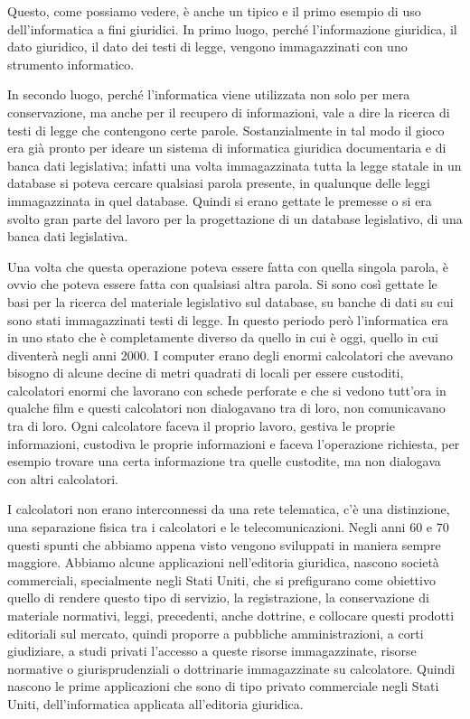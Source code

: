 Questo, come possiamo vedere, è anche un tipico e il primo esempio di uso dell'informatica a fini giuridici. In primo luogo, perché l'informazione giuridica, il dato giuridico, il dato dei testi di legge, vengono immagazzinati con uno strumento informatico. 

In secondo luogo, perché l'informatica viene utilizzata non solo per mera conservazione, ma anche per il recupero di informazioni, vale a dire la ricerca di testi di legge che contengono certe parole. Sostanzialmente in tal modo il gioco era già pronto per ideare un sistema di informatica giuridica documentaria e di banca dati legislativa; infatti una volta immagazzinata tutta la legge statale in un database si poteva cercare qualsiasi parola presente, in qualunque delle leggi immagazzinata in quel database. Quindi si erano gettate le premesse o si era svolto gran parte del lavoro per la progettazione di un database legislativo, di una banca dati legislativa. 

Una volta che questa operazione poteva essere fatta con quella singola parola, è ovvio che poteva essere fatta con qualsiasi altra parola. Si sono così gettate le basi per la ricerca del materiale legislativo sul database, su banche di dati su cui sono stati immagazzinati testi di legge. In questo periodo però l'informatica era in uno stato che è completamente diverso da quello in cui è oggi, quello in cui diventerà negli anni 2000. I computer erano degli enormi calcolatori che avevano bisogno di alcune decine di metri quadrati di locali per essere custoditi, calcolatori enormi che lavorano con schede perforate e che si vedono tutt'ora in qualche film e questi calcolatori non dialogavano tra di loro, non comunicavano tra di loro. Ogni calcolatore faceva il proprio lavoro, gestiva le proprie informazioni, custodiva le proprie informazioni e faceva l'operazione richiesta, per esempio trovare una certa informazione tra quelle custodite, ma non dialogava con altri calcolatori. 

I calcolatori non erano interconnessi da una rete telematica, c'è una distinzione, una separazione fisica tra i calcolatori e le telecomunicazioni. Negli anni 60 e 70 questi spunti che abbiamo appena visto vengono sviluppati in maniera sempre maggiore. Abbiamo alcune applicazioni nell'editoria giuridica, nascono società commerciali, specialmente negli Stati Uniti, che si prefigurano come obiettivo quello di rendere questo tipo di servizio, la registrazione, la conservazione di materiale normativi, leggi, precedenti, anche dottrine, e collocare questi prodotti editoriali sul mercato, quindi proporre a pubbliche amministrazioni, a corti giudiziare, a studi privati l'accesso a queste risorse immagazzinate, risorse normative o giurisprudenziali o dottrinarie immagazzinate su calcolatore. Quindi nascono le prime applicazioni che sono di tipo privato commerciale negli Stati Uniti, dell'informatica applicata all'editoria giuridica. 

